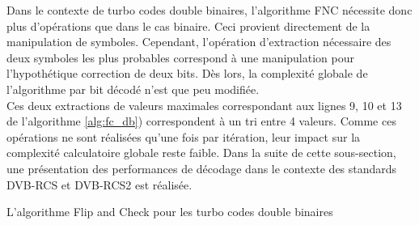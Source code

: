 Dans le contexte de turbo codes double binaires, l'algorithme FNC nécessite donc plus d'opérations que dans le cas binaire.
Ceci provient directement de la manipulation de symboles. Cependant, l'opération d'extraction nécessaire des deux symboles 
les plus probables correspond à une manipulation pour l'hypothétique correction de deux bits. Dès lors, la complexité globale
de l'algorithme par bit décodé n'est que peu modifiée.\\
Ces deux extractions de valeurs maximales correspondant aux lignes 9, 10 et 13 de l'algorithme \ref{alg:fc_db}) 
correspondent à un tri entre 4 valeurs.
Comme ces opérations
ne sont réalisées qu'une fois par itération, leur impact sur la complexité calculatoire globale reste faible. Dans la suite de 
cette sous-section, une présentation
des performances de décodage dans le contexte des standards DVB-RCS et DVB-RCS2 est réalisée.\vspace*{-1em}
\begin{center}
\begin{minipage}{.95\textwidth}%
\begin{algorithm}[H]
\label{alg:fc_db}
	\DontPrintSemicolon
	
	\;
	\caption{L'algorithme Flip and Check pour les turbo codes double binaires}
\end{algorithm}
\end{minipage}
\end{center}


